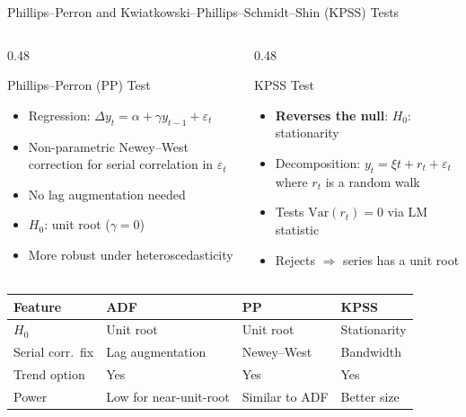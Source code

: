 \documentclass[9pt, aspectratio=169, t]{beamer}
\theoremstyle{definition}
\newenvironment{cminipage}[1]{%
    \par\noindent\hfill\begin{minipage}{#1}\ignorespaces
}{%
    \end{minipage}\hfill\null\par
}
\newcommand{\Var}{\text{Var}}
\begin{document}
\begin{frame}{Phillips--Perron and Kwiatkowski--Phillips--Schmidt--Shin (KPSS) Tests}
\begin{cminipage}{0.95\textwidth}
\small
\begin{columns}[T]
\begin{column}{0.48\textwidth}
\begin{block}{Phillips--Perron (PP) Test}
\begin{itemize}\setlength{\itemsep}{0pt}
    \item Regression: $\Delta y_t = \alpha + \gamma y_{t-1} + \varepsilon_t$
    \item Non-parametric Newey--West correction for serial correlation in $\varepsilon_t$
    \item No lag augmentation needed
    \item $H_0$: unit root ($\gamma = 0$)
    \item More robust under heteroscedasticity
\end{itemize}
\end{block}
\end{column}
\begin{column}{0.48\textwidth}
\begin{alertblock}{KPSS Test}
\begin{itemize}\setlength{\itemsep}{0pt}
    \item \textbf{Reverses the null}: $H_0$: stationarity
    \item Decomposition: $y_t = \xi t + r_t + \varepsilon_t$ where $r_t$ is a random walk
    \item Tests $\Var(r_t) = 0$ via LM statistic
    \item Rejects $\Rightarrow$ series has a unit root
\end{itemize}
\end{alertblock}
\end{column}
\end{columns}

\vspace{0.2cm}
\footnotesize
\renewcommand{\arraystretch}{1.1}
\begin{center}
\begin{tabular}{llll}
\toprule
\textbf{Feature} & \textbf{ADF} & \textbf{PP} & \textbf{KPSS} \\
\midrule
$H_0$ & Unit root & Unit root & Stationarity \\
Serial corr.\ fix & Lag augmentation & Newey--West & Bandwidth \\
Trend option & Yes & Yes & Yes \\
Power & Low for near-unit-root & Similar to ADF & Better size \\
\bottomrule
\end{tabular}
\end{center}
\end{cminipage}
\end{frame}
\end{document}
